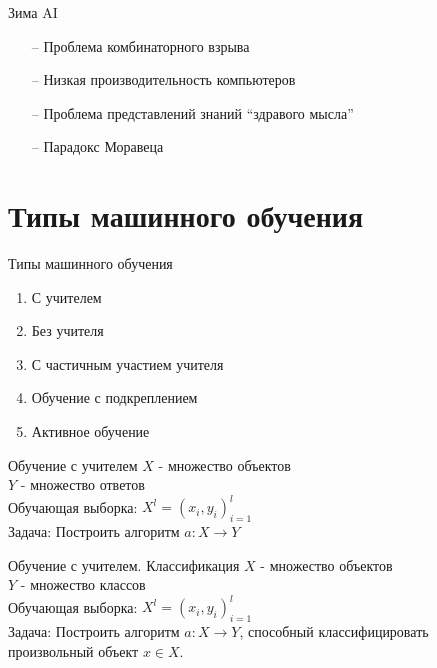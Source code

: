 \documentclass[10pt]{beamer}
\begin{document}
\begin{frame}{Зима AI}
	\begin{itemize} [<+->]
	  \item[--] Проблема комбинаторного взрыва
	  \item[--] Низкая производительность компьютеров
	  \item[--] Проблема представлений знаний “здравого мысла”
	  \item[--] Парадокс Моравеца
	\end{itemize}
\end{frame}

\section{Типы машинного обучения}

\begin{frame}{Типы машинного обучения}
	\begin{enumerate}
	  \item С учителем
	  \item Без учителя
	  \item С частичным участием учителя
	  \item Обучение с подкреплением
	  \item Активное обучение
	\end{enumerate}
\end{frame}

{
\begin{frame}{Обучение с учителем}
  	$X$ - множество объектов \\
	$Y$ - множество ответов \\
	Обучающая выборка: ${X^l = (x_i, y_i)_{i=1}^l}$ \\  
	\bigbreak
	\bigbreak
	\alert{Задача}: Построить алгоритм ${a \colon X \rightarrow Y}$
\end{frame}
}

{
\begin{frame}{Обучение с учителем. Классификация }
	$X$ - множество объектов \\
	$Y$ - множество классов \\
	Обучающая выборка: ${X^l = (x_i, y_i)_{i=1}^l}$ \\ 
	\bigbreak
	\bigbreak
	\alert{Задача}: Построить алгоритм ${a \colon X \rightarrow Y}$, способный классифицировать произвольный объект ${x \in X}$.
\end{frame}
}
\end{document}
